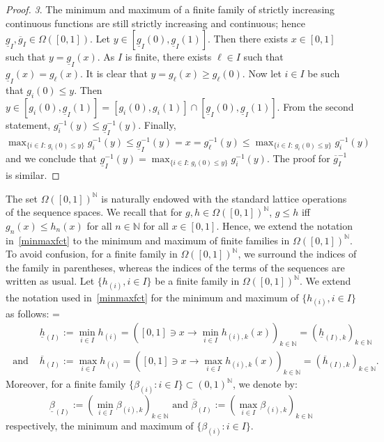 \documentclass{article}
\def\fset{\Omega([0,1])}
\def\nn{\mathbb N}
\def\red#1{#1}
\def\blue#1{#1}
\begin{document}
\begin{proof}
		{\itshape 3}. The minimum and maximum of a finite family of strictly increasing continuous functions \red{are} still strictly increasing and continuous; hence \blue{$\underline{g}_I,\overline{g}_I\in\fset$}. Let \blue{$y\in [\underline{g}_I(0),\underline{g}_I(1)]$}. Then there exists $x\in [0,1]$ such that \blue{$y=\underline{g}_I(x)$}. As $I$ is finite, there exists $\ell\in I$ such that \blue{$\underline{g}_I(x)=g_\ell (x)$. It is clear that $y=g_\ell(x)\geq g_\ell(0)$}. Now let \blue{$i\in I$ be such that $g_i(0)\leq y$}. Then \blue{$y\in [g_i(0),\underline{g}_I(1)]\blue{=[g_i(0),g_i(1)]\cap [\underline{g}_I(0),\underline{g}_I(1)]}$}. From the second statement, \blue{$g_i^{-1}(y)\leq \underline{g}_I^{-1}(y)$}. Finally, \blue{$\max_{\{i\in I:\, g_i(0)\leq y\}} g_i^{-1}(y)\leq  \underline{g}_I^{-1}(y)=x=g_\ell^{-1}(y)\leq \max_{\{i\in I:\, g_i(0)\leq y\}} g_i^{-1}(y)$} and we conclude that \blue{$\underline{g}_I^{-1}(y)=\max_{\{i\in I:\, g_i(0)\leq y\}} g_i^{-1}(y)$}. The proof for \blue{$\overline{g}_I^{-1}$} is similar.
	\end{proof}
	
	The set $\fset^\nn$ is naturally endowed with \red{the} standard lattice operations of \red{the} sequence spaces. We recall that for $g,h\in\fset^\nn$, $g\leq h$ iff $g_n(x)\leq h_n(x)$ for all $n\in\nn$ for all $x\in [0,1]$. Hence, \blue{we extend} the notation \red{in}~\eqref{minmaxfct} \blue{to} the minimum and maximum of \blue{finite families in $\fset^\nn$. To avoid confusion, for a finite family in $\fset^\nn$, we surround the indices of the family in parentheses, whereas the indices of the terms of the sequences are written as usual. Let $\{h_{(i)},i\in I\}$ be a finite family in $\fset^\nn$. We extend the notation used in~\eqref{minmaxfct} for the minimum and maximum of $\{h_{(i)},i\in I\}$ as follows}:
	{ \everymath={\displaystyle}
		\[
		\begin{array}{lc}
			&\underline{h}_{(I)}:=\min_{i\in I} h_{(i)}=\left([0,1]\ni x \to \min_{i\in I} h_{(i),k}(x)\right)_{k\in\nn}=\left(\underline{h}_{(I),k}\right)_{k\in\nn}\\
			\text{ and } & \overline{h}_{(I)}:=\max_{i\in I} h_{(i)}=\left([0,1]\ni x\to \max_{i\in I} h_{(i),k}(x)\right)_{k\in\nn}=\left(\overline{h}_{(I),k}\right)_{k\in\nn}.
		\end{array}
		\]
		Moreover, for a finite family $\{\beta_{(i)} : i\in I\}\subset (0,1)^\nn$, we denote by:
		\[
		\underline{\beta}_{(I)}:=\left(\min_{i\in I} \beta_{(i),k}\right)_{k\in\nn} \text{ and } \overline{\beta}_{(I)}:=\left(\max_{i\in I} \beta_{(i),k}\right)_{k\in\nn}
		\] 
		respectively, the minimum and maximum of $\{\beta_{(i)} : i\in I\}$.
	}
	
\end{document}
